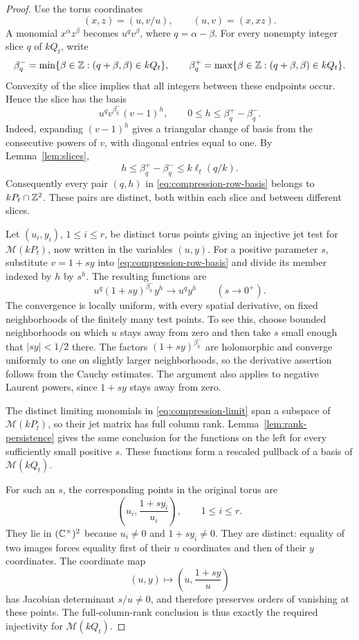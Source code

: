 \begin{proof}
Use the torus coordinates
\[
 (x,z)=(u,v/u),\qquad (u,v)=(x,xz).
\]
A monomial $x^\alpha z^\beta$ becomes $u^qv^\beta$, where
$q=\alpha-\beta$.  For every nonempty integer slice $q$ of $kQ_t$, write
\[
 \beta_q^-=
 \min\{\beta\in\mathbb Z:(q+\beta,\beta)\in kQ_t\},
 \qquad
 \beta_q^+=
 \max\{\beta\in\mathbb Z:(q+\beta,\beta)\in kQ_t\}.
\]
Convexity of the slice implies that all integers between these endpoints
occur.  Hence the slice has the basis
\begin{equation}\label{eq:compression-row-basis}
 u^qv^{\beta_q^-}(v-1)^h,
 \qquad 0\le h\le\beta_q^+-\beta_q^-.
\end{equation}
Indeed, expanding $(v-1)^h$ gives a triangular change of basis from the
consecutive powers of $v$, with diagonal entries equal to one.  By Lemma~\ref{lem:slices},
\[
 h\le\beta_q^+-\beta_q^-
 \le k\ell_t(q/k).
\]
Consequently every pair $(q,h)$ in
\eqref{eq:compression-row-basis} belongs to $kP_t\cap\mathbb Z^2$.
These pairs are distinct, both within each slice and between different slices.

Let $(u_i,y_i)$, $1\le i\le r$, be distinct torus points giving an
injective jet test for $\mathcal M(kP_t)$, now written in the variables
$(u,y)$.  For a positive parameter $s$, substitute $v=1+sy$ into
\eqref{eq:compression-row-basis} and divide its member indexed by $h$
by $s^h$.  The resulting functions are
\begin{equation}\label{eq:compression-limit}
 u^q(1+sy)^{\beta_q^-}y^h
 \longrightarrow u^qy^h
 \qquad (s\longrightarrow0^+).
\end{equation}
The convergence is locally uniform, with every spatial derivative, on
fixed neighborhoods of the finitely many test points.  To see this,
choose bounded neighborhoods on which $u$ stays away from zero and
then take $s$ small enough that $|sy|<1/2$ there.  The factors
$(1+sy)^{\beta_q^-}$ are holomorphic and converge uniformly to one on
slightly larger neighborhoods, so the derivative assertion follows
from the Cauchy estimates.  The argument also applies to negative
Laurent powers, since $1+sy$ stays away from zero.

The distinct limiting monomials in \eqref{eq:compression-limit} span
a subspace of $\mathcal M(kP_t)$, so their jet matrix has full column
rank.  Lemma~\ref{lem:rank-persistence} gives the same conclusion for
the functions on the left for every sufficiently small positive $s$.
These functions form a rescaled pullback of a basis of
$\mathcal M(kQ_t)$.

For such an $s$, the corresponding points in the original torus are
\[
 \left(u_i,\frac{1+sy_i}{u_i}\right),\qquad 1\le i\le r.
\]
They lie in $(\mathbb C^\times)^2$ because $u_i\ne0$ and $1+sy_i\ne0$.  They are distinct:
equality of two images forces equality first of their $u$ coordinates
and then of their $y$ coordinates.  The coordinate map
\[
 (u,y)\longmapsto\left(u,\frac{1+sy}{u}\right)
\]
has Jacobian determinant $s/u\ne0$, and therefore preserves orders of
vanishing at these points.  The full-column-rank conclusion is thus
exactly the required injectivity for $\mathcal M(kQ_t)$.
\end{proof}

